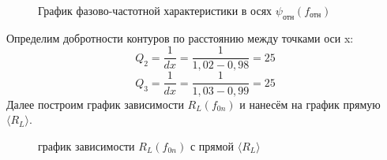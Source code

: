 \begin{figure}[H]
	\caption{\centering График фазово-частотной характеристики в осях $\psi_{\text{отн}}(f_{\text{отн}})$}
	\label{fig:image2}
\end{figure}
Определим добротности контуров по расстоянию между точками оси x:
\begin{equation}
    Q_2=\frac{1}{dx}=\frac{1}{1,02-0,98}=25
\end{equation}
\begin{equation}
    Q_3=\frac{1}{dx}=\frac{1}{1,03-0,99}=25
\end{equation}
Далее построим график зависимости $R_L(f_{0n})$ и нанесём на график прямую $\langle R_L \rangle$.
\begin{figure}[H]
	\caption{\centering график зависимости $R_L(f_{0n})$ с прямой $\langle R_L \rangle$}
	\label{fig:image2}
\end{figure}
